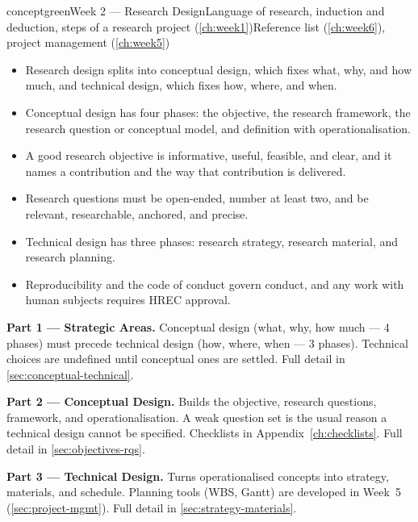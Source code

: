 \documentclass[../main.tex]{subfiles}
\begin{document}
\begin{snapcard}{conceptgreen}{Week 2 — Research Design}{Language of research, induction and deduction, steps of a research project (\autoref{ch:week1})}{Reference list (\autoref{ch:week6}), project management (\autoref{ch:week5})}
\begin{itemize}
  \item Research design splits into conceptual design, which fixes what, why, and how much, and technical design, which fixes how, where, and when.
  \item Conceptual design has four phases: the objective, the research framework, the research question or conceptual model, and definition with operationalisation.
  \item A good research objective is informative, useful, feasible, and clear, and it names a contribution and the way that contribution is delivered.
  \item Research questions must be open-ended, number at least two, and be relevant, researchable, anchored, and precise.
  \item Technical design has three phases: research strategy, research material, and research planning.
  \item Reproducibility and the code of conduct govern conduct, and any work with human subjects requires HREC approval.
\end{itemize}
\end{snapcard}

\begin{partbox}\textbf{Part 1 — Strategic Areas.} Conceptual design (what, why, how much — 4 phases) must precede technical design (how, where, when — 3 phases). Technical choices are undefined until conceptual ones are settled. Full detail in \autoref{sec:conceptual-technical}.\end{partbox}

\begin{partbox}\textbf{Part 2 — Conceptual Design.} Builds the objective, research questions, framework, and operationalisation. A weak question set is the usual reason a technical design cannot be specified. Checklists in Appendix~\ref{ch:checklists}. Full detail in \autoref{sec:objectives-rqs}.\end{partbox}

\begin{partbox}\textbf{Part 3 — Technical Design.} Turns operationalised concepts into strategy, materials, and schedule. Planning tools (WBS, Gantt) are developed in Week~5 (\autoref{sec:project-mgmt}). Full detail in \autoref{sec:strategy-materials}.\end{partbox}
\end{document}
